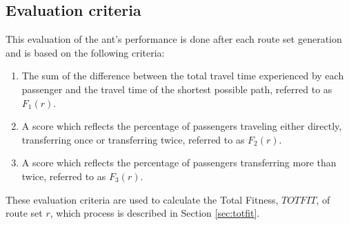 \subsection{Evaluation criteria} 
This evaluation of the ant's performance is done after each route set generation and is based on the following criteria:
\begin{enumerate}
\item \label{itm:criteriaTotalTravelTime} The sum of the difference between the total travel time experienced by each passenger and the travel time of the shortest possible path, referred to as $F_1(r)$.
\item \label{itm:f2} A score which reflects the percentage of passengers traveling either directly, transferring once or transferring twice, referred to as $F_2(r)$.
\item A score which reflects the percentage of passengers transferring more than twice, referred to as $F_3(r)$. 
\end{enumerate}
These evaluation criteria are used to calculate the Total Fitness, $TOTFIT$, of route set $r$, which process is described in Section \vref{sec:totfit}.



